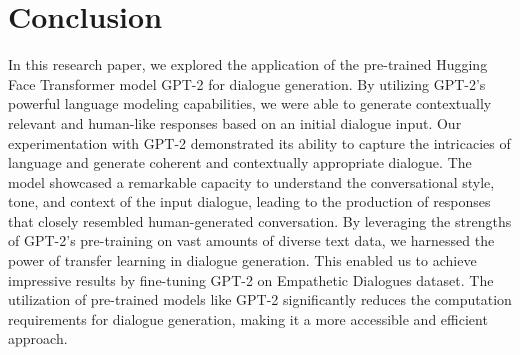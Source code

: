 \documentclass[12pt]{IEEEtran}
\begin{document}
\section{Conclusion}
In this research paper, we explored the application of the pre-trained Hugging Face Transformer model GPT-2 for dialogue generation. By utilizing GPT-2's powerful language modeling capabilities, we were able to generate contextually relevant and human-like responses based on an initial dialogue input. Our experimentation with GPT-2 demonstrated its ability to capture the intricacies of language and generate coherent and contextually appropriate dialogue. The model showcased a remarkable capacity to understand the conversational style, tone, and context of the input dialogue, leading to the production of responses that closely resembled human-generated conversation. By leveraging the strengths of GPT-2's pre-training on vast amounts of diverse text data, we harnessed the power of transfer learning in dialogue generation. This enabled us to achieve impressive results by fine-tuning GPT-2 on Empathetic Dialogues dataset. The utilization of pre-trained models like GPT-2 significantly reduces the computation requirements for dialogue generation, making it a more accessible and efficient approach.



\end{document}
